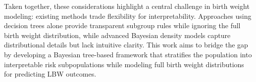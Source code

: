 Taken together, these considerations highlight a central challenge in birth weight modeling: existing methods trade flexibility for interpretability. Approaches using decision trees alone provide transparent subgroup rules while ignoring the full birth weight distribution, while advanced Bayesian density models capture distributional details but lack intuitive clarity. This work aims to bridge the gap by developing a Bayesian tree-based framework that stratifies the population into interpretable risk subpopulations while modeling full birth weight distributions for predicting LBW outcomes.

